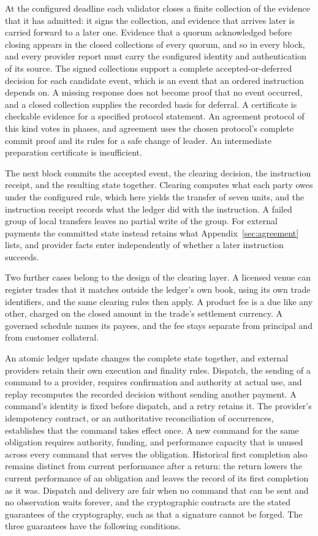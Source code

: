 \documentclass{momentum}
\begin{document}
At the configured deadline each validator closes a finite collection of the evidence that it has admitted: it signs the collection, and evidence that arrives later is carried forward to a later one. Evidence that a quorum acknowledged before closing appears in the closed collections of every quorum, and so in every block, and every provider report must carry the configured identity and authentication of its source. The signed collections support a complete accepted-or-deferred decision for each candidate event, which is an event that an ordered instruction depends on. A missing response does not become proof that no event occurred, and a closed collection supplies the recorded basis for deferral. A certificate is checkable evidence for a specified protocol statement. An agreement protocol of this kind votes in phases, and agreement uses the chosen protocol's complete commit proof and its rules for a safe change of leader. An intermediate preparation certificate is insufficient.

The next block commits the accepted event, the clearing decision, the instruction receipt, and the resulting state together. Clearing computes what each party owes under the configured rule, which here yields the transfer of seven units, and the instruction receipt records what the ledger did with the instruction. A failed group of local transfers leaves no partial write of the group. For external payments the committed state instead retains what Appendix~\ref{sec:agreement} lists, and provider facts enter independently of whether a later instruction succeeds.

Two further cases belong to the design of the clearing layer. A licensed venue can register trades that it matches outside the ledger's own book, using its own trade identifiers, and the same clearing rules then apply. A product fee is a due like any other, charged on the closed amount in the trade's settlement currency. A governed schedule names its payees, and the fee stays separate from principal and from customer collateral.

An atomic ledger update changes the complete state together, and external providers retain their own execution and finality rules. Dispatch, the sending of a command to a provider, requires confirmation and authority at actual use, and replay recomputes the recorded decision without sending another payment. A command's identity is fixed before dispatch, and a retry retains it. The provider's idempotency contract, or an authoritative reconciliation of occurrences, establishes that the command takes effect once. A new command for the same obligation requires authority, funding, and performance capacity that is unused across every command that serves the obligation. Historical first completion also remains distinct from current performance after a return: the return lowers the current performance of an obligation and leaves the record of its first completion as it was. Dispatch and delivery are fair when no command that can be sent and no observation waits forever, and the cryptographic contracts are the stated guarantees of the cryptography, such as that a signature cannot be forged. The three guarantees have the following conditions.
\end{document}

